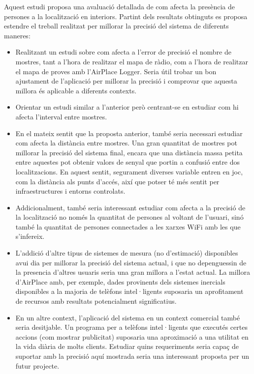 
Aquest estudi proposa una avaluació detallada de com afecta la presència de persones a la localització en interiors. Partint dels resultats obtinguts es proposa estendre el treball realitzat per millorar la precisió del sistema de diferents maneres:

\begin{itemize}
    \item Realitzant un estudi sobre com afecta a l'error de precisió el nombre de mostres, tant a l'hora de realitzar el mapa de ràdio, com a l'hora de realitzar el mapa de proves amb l'AirPlace Logger. Seria útil trobar un bon ajustament de l'aplicació per millorar la precisió i comprovar que aquesta millora és aplicable a diferents contexts.
    \item Orientar un estudi similar a l'anterior però centrant-se en estudiar com hi afecta l'interval entre mostres.
    \item En el mateix sentit que la proposta anterior, també seria necessari estudiar com afecta la distància entre mostres. Una gran quantitat de mostres pot millorar la precisió del sistema final, encara que una distància massa petita entre aquestes pot obtenir valors de senyal que portin a confusió entre dos localitzacions. En aquest sentit, segurament diverses variable entren en joc, com la distància als punts d'accés, així que potser té més sentit per infraestructures i entorns controlats.
    \item Addicionalment, també seria interessant estudiar com afecta a la precisió de la localització no només la quantitat de persones al voltant de l'usuari, sinó també la quantitat de persones connectades a les xarxes WiFi amb les que s'infereix.
    \item L'addició d'altre tipus de sistemes de mesura (no d'estimació) disponibles avui dia per millorar la precisió del sistema actual, i que no depenguessin de la presencia d'altres usuaris seria una gran millora a l'estat actual. La millora d'AirPlace amb, per exemple, dades provinents dels sistemes inercials disponibles a la majoria de telèfons intel·ligents suposaria un aprofitament de recursos amb resultats potencialment significatius.
    \item En un altre context, l'aplicació del sistema en un context comercial també seria desitjable. Un programa per a telèfons intel·ligents que executés certes accions (com mostrar publicitat) suposaria una aproximació a una utilitat en la vida diària de molts clients. Estudiar quins requeriments seria capaç de suportar amb la precisió aquí mostrada seria una interessant proposta per un futur projecte.
\end{itemize}
